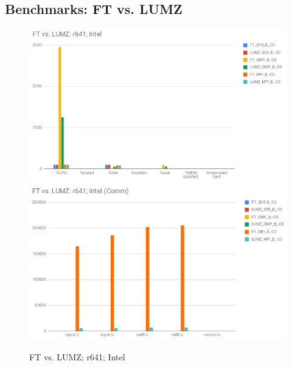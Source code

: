\documentclass{article}
\begin{document}
\begin{appendices}
\subsection{Benchmarks: FT vs. LUMZ}
\begin{figure}[H]
    \centering
    \includegraphics[width=12cm]{Pictures/FT_LUMZ_r641_Intel_Comp.png}
    \includegraphics[width=12cm]{Pictures/FT_LUMZ_r641_Intel_Comm.png}
    \caption{FT vs. LUMZ; r641; Intel}
    \label{fig:FT_LUMZ_r641}
\end{figure}


\end{appendices}
\end{document}
